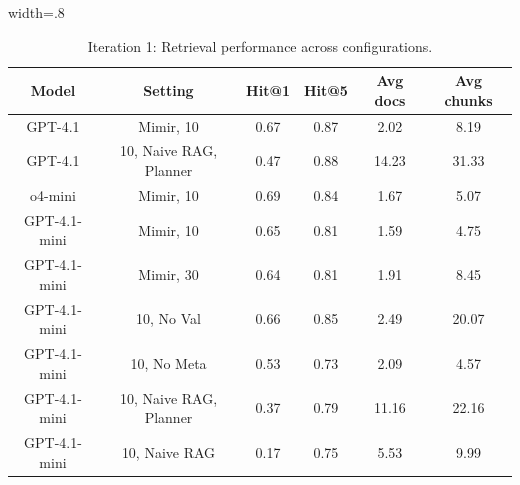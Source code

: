 \documentclass[final,5p,times,twopage,twocolumn,a4paper]{elsarticle}
\begin{document}
\begin{table}[!hbt]
\centering
\caption{Iteration 1: Retrieval performance across configurations.}
\label{tab:doc-performance-iter1}
\begin{adjustbox}{width=.8\textwidth}
\begin{tabular}{|c|c|c|c|c|c|}
  \hline
  \multicolumn{1}{|c|}{\textbf{Model}}
    & \multicolumn{1}{c|}{\textbf{Setting}}
    & \multicolumn{1}{c|}{\textbf{Hit@1}}
    & \multicolumn{1}{c|}{\textbf{Hit@5}}
    & \multicolumn{1}{c|}{\textbf{Avg docs}}
    & \textbf{Avg chunks} \\ \hline

  \multicolumn{1}{|c|}{GPT-4.1}
    & \multicolumn{1}{c|}{Mimir, 10}
    & \multicolumn{1}{c|}{0.67}
    & \multicolumn{1}{c|}{0.87}
    & \multicolumn{1}{c|}{2.02}
    & 8.19                \\ \hline

  \multicolumn{1}{|c|}{GPT-4.1}
    & \multicolumn{1}{c|}{10, Naive RAG, Planner}
    & \multicolumn{1}{c|}{0.47}
    & \multicolumn{1}{c|}{0.88}
    & \multicolumn{1}{c|}{14.23}
    & 31.33               \\ \hline

  \multicolumn{1}{|c|}{o4-mini}
    & \multicolumn{1}{c|}{Mimir, 10}
    & \multicolumn{1}{c|}{0.69}
    & \multicolumn{1}{c|}{0.84}
    & \multicolumn{1}{c|}{1.67}
    & 5.07                \\ \hline

  \multicolumn{1}{|c|}{GPT-4.1-mini}
    & \multicolumn{1}{c|}{Mimir, 10}
    & \multicolumn{1}{c|}{0.65}
    & \multicolumn{1}{c|}{0.81}
    & \multicolumn{1}{c|}{1.59}
    & 4.75                \\ \hline

  \multicolumn{1}{|c|}{GPT-4.1-mini}
    & \multicolumn{1}{c|}{Mimir, 30}
    & \multicolumn{1}{c|}{0.64}
    & \multicolumn{1}{c|}{0.81}
    & \multicolumn{1}{c|}{1.91}
    & 8.45                \\ \hline

  \multicolumn{1}{|c|}{GPT-4.1-mini}
    & \multicolumn{1}{c|}{10, No Val}
    & \multicolumn{1}{c|}{0.66}
    & \multicolumn{1}{c|}{0.85}
    & \multicolumn{1}{c|}{2.49}
    & 20.07               \\ \hline

  \multicolumn{1}{|c|}{GPT-4.1-mini}
    & \multicolumn{1}{c|}{10, No Meta}
    & \multicolumn{1}{c|}{0.53}
    & \multicolumn{1}{c|}{0.73}
    & \multicolumn{1}{c|}{2.09}
    & 4.57                \\ \hline

  \multicolumn{1}{|c|}{GPT-4.1-mini}
    & \multicolumn{1}{c|}{10, Naive RAG, Planner}
    & \multicolumn{1}{c|}{0.37}
    & \multicolumn{1}{c|}{0.79}
    & \multicolumn{1}{c|}{11.16}
    & 22.16               \\ \hline

  \multicolumn{1}{|c|}{GPT-4.1-mini}
    & \multicolumn{1}{c|}{10, Naive RAG}
    & \multicolumn{1}{c|}{0.17}
    & \multicolumn{1}{c|}{0.75}
    & \multicolumn{1}{c|}{5.53}
    & 9.99                \\ \hline
\end{tabular}
\end{adjustbox}
\end{table}
\end{document}
